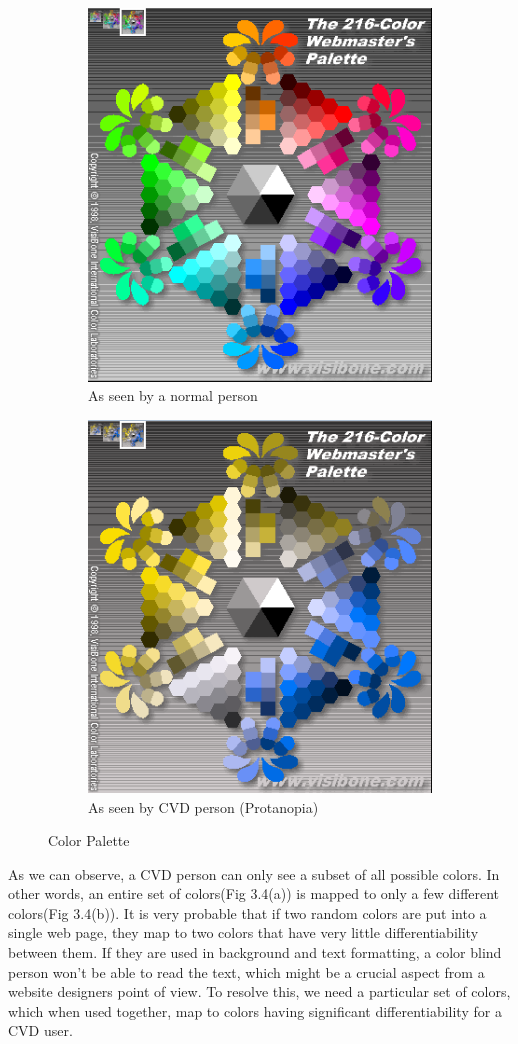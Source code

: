 \begin{figure}[!htb]
\centering
\begin{subfigure}{.5\textwidth}
  \centering
  \includegraphics[width=.5\linewidth]{ColorMapNormal.png}
  \caption{As seen by a normal person}
  \label{fig:sub1}
\end{subfigure}%
\begin{subfigure}{.5\textwidth}
  \centering
  \includegraphics[width=.5\linewidth]{ColorMapCVD.png}
  \caption{As seen by CVD person (Protanopia)}
  \label{fig:sub2}
\end{subfigure}
\caption{Color Palette}
\label{fig:test}
\end{figure}

As we can observe, a CVD person can only see a subset of all possible colors. In other words, an entire set of colors(Fig 3.4(a)) is mapped to only a few different colors(Fig 3.4(b)). It is very probable that if two random colors are put into a single web page, they map to two colors that have very little differentiability between them. If they are used in background and text formatting, a color blind person won't be able to read the text, which might be a crucial aspect from a website designers point of view. To resolve this, we need a particular set of colors, which when used together, map to colors having significant differentiability for a CVD user.


